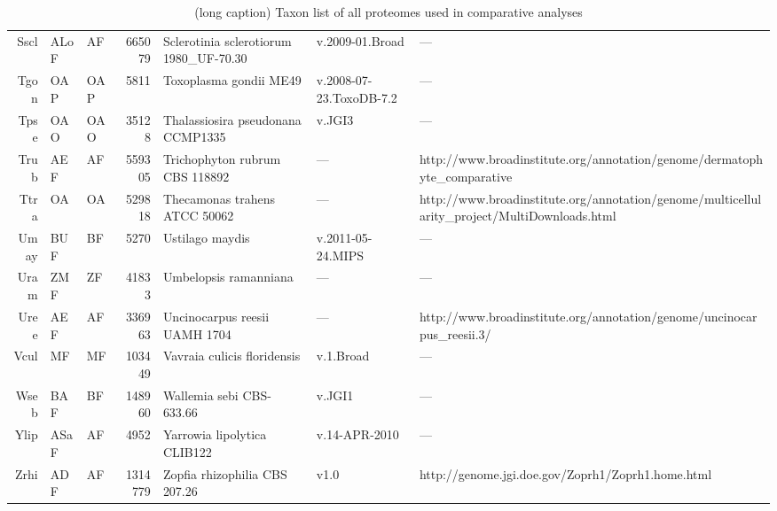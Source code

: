 \begin{table}[tbp]
\begin{tabular}{rllrlll}
  Sscl & ALoF & AF & 665079 & Sclerotinia sclerotiorum 1980\_UF-70.30 & v.2009-01.Broad & --- \\ 
  Tgon & OAP & OAP & 5811 & Toxoplasma gondii ME49 & v.2008-07-23.ToxoDB-7.2 & --- \\ 
  Tpse & OAO & OAO & 35128 & Thalassiosira pseudonana CCMP1335 & v.JGI3 & --- \\ 
  Trub & AEF & AF & 559305 & Trichophyton rubrum CBS 118892 & --- & http://www.broadinstitute.org/annotation/genome/dermatophyte\_comparative \\ 
  Ttra & OA & OA & 529818 & Thecamonas trahens ATCC 50062 & --- & http://www.broadinstitute.org/annotation/genome/multicellularity\_project/MultiDownloads.html \\ 
  Umay & BUF & BF & 5270 & Ustilago maydis & v.2011-05-24.MIPS & --- \\ 
  Uram & ZMF & ZF & 41833 & Umbelopsis ramanniana & --- & --- \\ 
  Uree & AEF & AF & 336963 & Uncinocarpus reesii UAMH 1704 & --- & http://www.broadinstitute.org/annotation/genome/uncinocarpus\_reesii.3/ \\ 
  Vcul & MF & MF & 103449 & Vavraia culicis floridensis & v.1.Broad & --- \\ 
  Wseb & BAF & BF & 148960 & Wallemia sebi CBS-633.66 & v.JGI1 & --- \\ 
  Ylip & ASaF & AF & 4952 & Yarrowia lipolytica CLIB122 & v.14-APR-2010 & --- \\ 
  Zrhi & ADF & AF & 1314779 & Zopfia rhizophilia CBS 207.26 & v1.0 & http://genome.jgi.doe.gov/Zoprh1/Zoprh1.home.html \\ 
   \hline
\hline
\end{tabular}
\caption[(short caption) Taxon list of all proteomes used in comparative analyses.]{(long caption) Taxon list of all proteomes used in comparative analyses} 
\label{tab:AppData_taxa}
\end{table}
